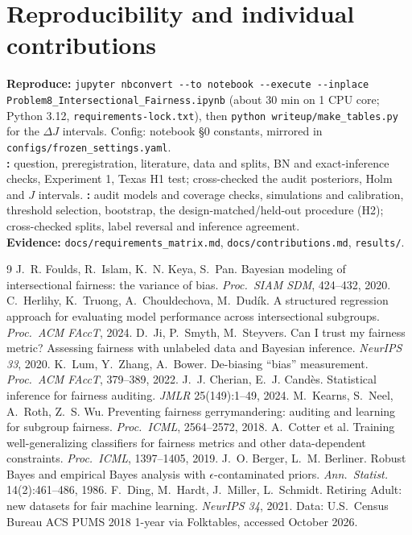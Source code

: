 \documentclass[11pt,a4paper]{article}
\begin{document}
\section*{Reproducibility and individual contributions}
\textbf{Reproduce:} \texttt{jupyter nbconvert -{}-to notebook -{}-execute -{}-inplace}
\texttt{Problem8\_\allowbreak Intersectional\_\allowbreak Fairness.ipynb} (about 30 min on 1 CPU core; Python 3.12,
\nolinkurl{requirements-lock.txt}), then \texttt{python writeup/make\_tables.py} for the $\Delta J$ intervals. Config:
notebook \S0 constants, mirrored in \nolinkurl{configs/frozen_settings.yaml}.\\
\textbf{\StudentA:} question, preregistration, literature, data and splits, BN and exact-inference checks,
Experiment 1, Texas H1 test; cross-checked the audit posteriors, Holm and $J$ intervals.
\textbf{\StudentB:} audit models and coverage checks, simulations and calibration, threshold selection, bootstrap,
the design-matched/held-out procedure (H2); cross-checked splits, label reversal and inference agreement.\\
\textbf{Evidence:} \texttt{docs/requirements\_matrix.md}, \texttt{docs/contributions.md}, \texttt{results/}.
\begin{thebibliography}{9}\footnotesize\setlength{\itemsep}{0pt}\setlength{\parskip}{0pt}
 J.~R. Foulds, R.~Islam, K.~N. Keya, S.~Pan. Bayesian modeling of intersectional fairness: the variance of bias. \emph{Proc.\ SIAM SDM}, 424--432, 2020.
 C.~Herlihy, K.~Truong, A.~Chouldechova, M.~Dud\'ik. A structured regression approach for evaluating model performance across intersectional subgroups. \emph{Proc.\ ACM FAccT}, 2024.
 D.~Ji, P.~Smyth, M.~Steyvers. Can I trust my fairness metric? Assessing fairness with unlabeled data and Bayesian inference. \emph{NeurIPS 33}, 2020.
 K.~Lum, Y.~Zhang, A.~Bower. De-biasing ``bias'' measurement. \emph{Proc.\ ACM FAccT}, 379--389, 2022.
 J.~J. Cherian, E.~J. Cand\`es. Statistical inference for fairness auditing. \emph{JMLR} 25(149):1--49, 2024.
 M.~Kearns, S.~Neel, A.~Roth, Z.~S. Wu. Preventing fairness gerrymandering: auditing and learning for subgroup fairness. \emph{Proc.\ ICML}, 2564--2572, 2018.
 A.~Cotter et al. Training well-generalizing classifiers for fairness metrics and other data-dependent constraints. \emph{Proc.\ ICML}, 1397--1405, 2019.
 J.~O. Berger, L.~M. Berliner. Robust Bayes and empirical Bayes analysis with $\epsilon$-contaminated priors. \emph{Ann.\ Statist.} 14(2):461--486, 1986.
 F.~Ding, M.~Hardt, J.~Miller, L.~Schmidt. Retiring Adult: new datasets for fair machine learning. \emph{NeurIPS 34}, 2021. Data: U.S.\ Census Bureau ACS PUMS 2018 1-year via Folktables, accessed October 2026.
\end{thebibliography}
\end{document}
